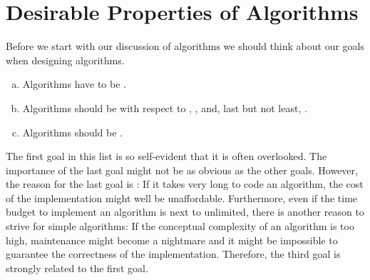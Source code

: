 \section{Desirable Properties of Algorithms}
Before we start with our discussion of algorithms we should think about our goals when designing
algorithms.  
\begin{enumerate}[(a)]
\item Algorithms have to be .
\item Algorithms should be  with respect to , , and,
      last but not least, .
\item Algorithms should be .
\end{enumerate}
The first goal in this list is so self-evident that it is often overlooked.  The
importance of the last goal might not be as obvious as the other goals.
However, the reason for the last goal is :  If it takes very long to code an algorithm, the
cost of the implementation might well be unaffordable.  Furthermore, even if the time budget to implement an
algorithm is next to unlimited,  there is another reason to strive for simple algorithms:  If the conceptual
complexity of an algorithm is too high, maintenance might become a nightmare and it might be impossible to
guarantee the correctness of the implementation.  Therefore, the third goal is strongly related to the first goal.  

